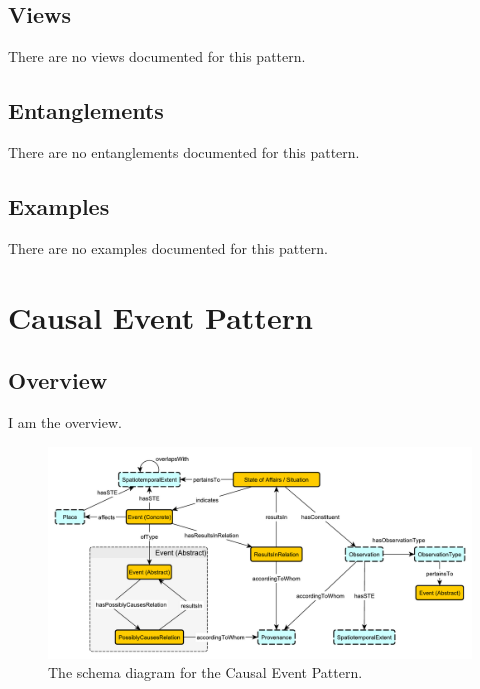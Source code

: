 \subsection{Views}
\label{ssec:views}
There are no views documented for this pattern.


\subsection{Entanglements}
\label{ssec:entanglements}
There are no entanglements documented for this pattern.

\subsection{Examples}
\label{ssec:examples}
There are no examples documented for this pattern.


\section{Causal Event Pattern}
\label{sec:causal-event-pattern}
\subsection{Overview}
\label{ssec:overview}
I am the overview.

\begin{figure}[h!]
  \begin{center}
    \includegraphics[width=\textwidth]{resources/causal-event-pattern.pdf}
  \end{center}
  \caption{The schema diagram for the Causal Event Pattern.}
  \label{fig:ov-diagram}
\end{figure}


